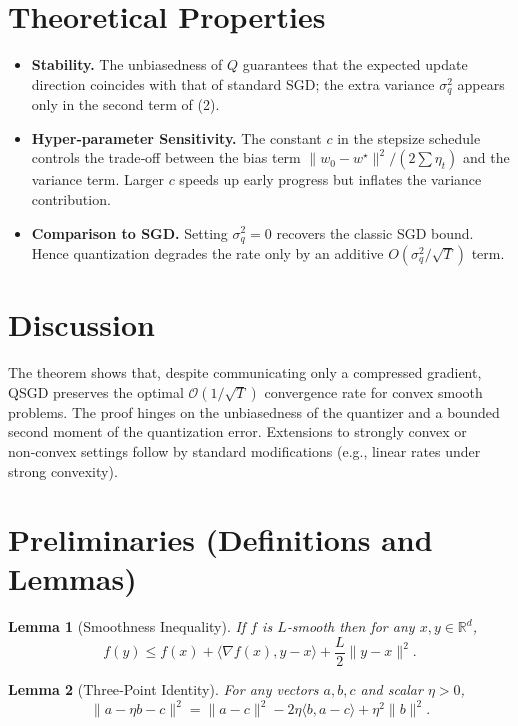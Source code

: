 \documentclass{article}
\newtheorem{lemma}{Lemma}
\newcommand{\R}{\mathbb{R}}
\begin{document}
\section*{Theoretical Properties}
\begin{itemize}
\item \textbf{Stability.} The unbiasedness of $Q$ guarantees that the expected update direction coincides with that of standard SGD; the extra variance $\sigma_{q}^{2}$ appears only in the second term of (2).
\item \textbf{Hyper‑parameter Sensitivity.} The constant $c$ in the stepsize schedule controls the trade‑off between the bias term $\|w_0-w^{\star}\|^{2}/(2\sum\eta_t)$ and the variance term. Larger $c$ speeds up early progress but inflates the variance contribution.
\item \textbf{Comparison to SGD.} Setting $\sigma_{q}^{2}=0$ recovers the classic SGD bound. Hence quantization degrades the rate only by an additive $O(\sigma_{q}^{2}/\sqrt{T})$ term.
\end{itemize}

\section*{Discussion}
The theorem shows that, despite communicating only a compressed gradient, QSGD preserves the optimal $\mathcal{O}(1/\sqrt{T})$ convergence rate for convex smooth problems. The proof hinges on the unbiasedness of the quantizer and a bounded second moment of the quantization error. Extensions to strongly convex or non‑convex settings follow by standard modifications (e.g., linear rates under strong convexity).

\section*{Preliminaries (Definitions and Lemmas)}
\begin{lemma}[Smoothness Inequality]\label{lem:smooth}
If $f$ is $L$‑smooth then for any $x,y\in\R^{d}$,
\[
f(y)\le f(x)+\langle\nabla f(x),y-x\rangle+\frac{L}{2}\|y-x\|^{2}.
\]
\end{lemma}
\begin{lemma}[Three‑Point Identity]\label{lem:three}
For any vectors $a,b,c$ and scalar $\eta>0$,
\[
\|a-\eta b-c\|^{2}= \|a-c\|^{2}-2\eta\langle b,a-c\rangle+\eta^{2}\|b\|^{2}.
\]
\end{lemma}
\end{document}
